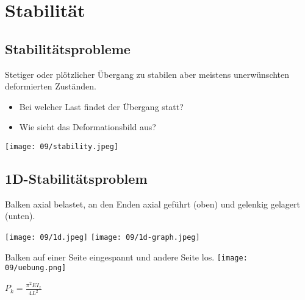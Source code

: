 \section{Stabilität}
    \subsection{Stabilitätsprobleme}
        Stetiger oder plötzlicher Übergang zu stabilen aber meistens unerwünschten deformierten Zuständen.\vspace{-1mm}
        \begin{itemize}
            \item Bei welcher Last findet der Übergang statt?
            \item Wie sieht das Deformationsbild aus?
        \end{itemize}
        \begin{center}
            \texttt{[image: 09/stability.jpeg]}
        \end{center}
    \subsection{1D-Stabilitätsproblem}
        Balken axial belastet, an den Enden axial geführt (oben) und gelenkig gelagert (unten).
        \begin{center}
            \texttt{[image: 09/1d.jpeg]}
            \texttt{[image: 09/1d-graph.jpeg]}
        \end{center}
        \vspace{-3mm}
        Balken auf einer Seite eingespannt und andere Seite los.
        \texttt{[image: 09/uebung.png]}
        \vspace{-17mm}
        \begin{flushright}
        $\displaystyle P_k=\frac{\pi^2EI_z}{4L^2}\qquad\qquad$
        \end{flushright}
        \vspace{5mm}
        
        \begin{comment}
        \subsubsection{Plastifizieren vor Knicken}
            $P_{plast} \leqslant P_k $
        \end{comment}
